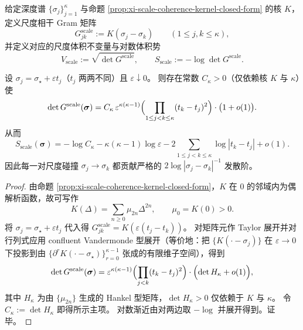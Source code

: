 \begin{definition}\label{def:xi-scale-coherence-gram-volume}
给定深度谱 \(\{\sigma_j\}_{j=1}^{\kappa}\) 与命题 \ref{prop:xi-scale-coherence-kernel-closed-form} 的核 \(K\)，定义尺度相干 Gram 矩阵
\[
G^{\mathrm{scale}}_{jk}:=K(\sigma_j-\sigma_k)\qquad(1\le j,k\le\kappa),
\]
并定义对应的尺度体积不变量与对数体积势
\[
V_{\mathrm{scale}}:=\sqrt{\det G^{\mathrm{scale}}},
\qquad
S_{\mathrm{scale}}:=-\log\det G^{\mathrm{scale}}.
\]
\end{definition}

\begin{proposition}\label{prop:xi-scale-coherence-collision-vandermonde}
设 \(\sigma_j=\sigma_\star+\varepsilon t_j\)（\(t_j\) 两两不同）且 \(\varepsilon\downarrow 0\)。
则存在常数 \(C_\kappa>0\)（仅依赖核 \(K\) 与 \(\kappa\)）使
\[
\det G^{\mathrm{scale}}(\boldsymbol{\sigma})
= C_\kappa\,\varepsilon^{\kappa(\kappa-1)}
\Bigl(\prod_{1\le j<k\le\kappa}(t_k-t_j)^2\Bigr)\cdot\bigl(1+o(1)\bigr).
\]
从而
\[
S_{\mathrm{scale}}(\boldsymbol{\sigma})
= -\log C_\kappa-\kappa(\kappa-1)\log\varepsilon-2\sum_{1\le j<k\le\kappa}\log|t_k-t_j|+o(1).
\]
因此每一对尺度碰撞 \(\sigma_j\to\sigma_k\) 都贡献严格的 \(2\log|\sigma_j-\sigma_k|^{-1}\) 发散阶。
\end{proposition}
\begin{proof}
由命题 \ref{prop:xi-scale-coherence-kernel-closed-form}，\(K\) 在 \(0\) 的邻域内为偶解析函数，故可写作
\[
K(\Delta)=\sum_{n\ge 0}\mu_{2n}\Delta^{2n},\qquad \mu_0=K(0)>0.
\]
将 \(\sigma_j=\sigma_\star+\varepsilon t_j\) 代入得
\(
G^{\mathrm{scale}}_{jk}=K(\varepsilon(t_j-t_k))
\)。
对矩阵元作 Taylor 展开并对行列式应用 confluent Vandermonde 型展开（等价地：把 \(\{K(\cdot-\sigma_j)\}\) 在 \(\varepsilon\to 0\) 下投影到由 \(\{\partial^r K(\cdot-\sigma_\star)\}_{r=0}^{\kappa-1}\) 张成的有限维子空间），得到
\[
\det G^{\mathrm{scale}}(\boldsymbol{\sigma})
=\varepsilon^{\kappa(\kappa-1)}\Bigl(\prod_{j<k}(t_k-t_j)^2\Bigr)\cdot\Bigl(\det H_\kappa+o(1)\Bigr),
\]
其中 \(H_\kappa\) 为由 \(\{\mu_{2n}\}\) 生成的 Hankel 型矩阵，\(\det H_\kappa>0\) 仅依赖于 \(K\) 与 \(\kappa\)。
令 \(C_\kappa:=\det H_\kappa\) 即得所示主项。
对数渐近由对两边取 \(-\log\) 并展开得到。证毕。
\end{proof}

